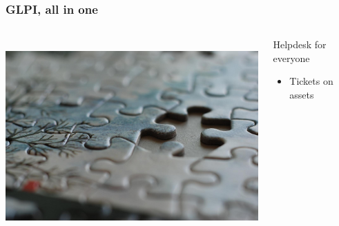 \documentclass{beamer}
\begin{document}
\begin{frame}


    \frametitle{GLPI, all in one}
 \begin{columns}
 \begin{column}{0.45\textwidth}
         \includegraphics[height=7.5cm]{./pics/glpithelink.jpg}
 \end{column}
 \begin{column}{0.65\textwidth}
    \begin{block}{Helpdesk for everyone}
        \begin{itemize}
            \item Tickets on assets
        \end{itemize}

    \end{block}

 \end{column}
\end{columns}
\end{frame}
\end{document}
